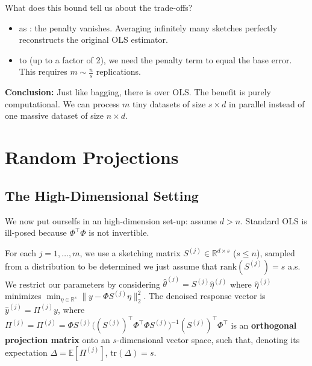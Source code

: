 \documentclass[
11pt,notheorems,hyperref={pdfauthor=whatever}
]{beamer}
\begin{document}
\begin{frame}
    What does this bound tell us about the trade-offs?
    \begin{itemize}
        \item as : the penalty vanishes. Averaging infinitely many sketches perfectly reconstructs the original OLS estimator.
        \item to  (up to a factor of 2), we need the penalty term to equal the base error. This requires \(m \sim \frac{n}{s}\) replications.
    \end{itemize}
    \vspace{0.5cm}
    \textbf{Conclusion:} Just like bagging, there is  over OLS. The benefit is purely computational. We can process \(m\) tiny datasets of size \(s \times d\) in parallel instead of one massive dataset of size \(n \times d\).
\end{frame}

\section{Random Projections}
\subsection{The High-Dimensional Setting}
\begin{frame}
    We now put ourselfs in an high-dimension set-up: assume \(d > n\). Standard OLS is ill-posed because \(\Phi^\top\Phi\) is not invertible.
    
    For each \(j = 1,\dots,m\), we use a sketching matrix \(S^{(j)} \in \mathbb{R}^{d \times s}\) (\(s \le n\)), sampled from a distribution to be determined we just assume that \(\text{rank}(S^{(j)}) = s\) a.s. We restrict our parameters by considering \(\hat{\theta}^{(j)} = S^{(j)}\hat{\eta}^{(j)}\) where \(\hat{\eta}^{(j)}\) minimizes \(\min_{\eta \in \mathbb{R}^s} \|y - \Phi S^{(j)}\eta\|_2^2\).
    The denoised response vector is \(\hat{y}^{(j)} = \Pi^{(j)} y\), where \(\Pi^{(j)} = \Pi^{(j)} = \Phi S^{(j)} \big((S^{(j)})^\top\Phi^\top\Phi S^{(j)}\big)^{-1} (S^{(j)})^\top\Phi^\top\) is an \alert{\textbf{orthogonal projection matrix}} onto an \(s\)-dimensional vector space, such that, denoting its expectation \(\Delta = \mathbb{E}[\Pi^{(j)}]\), \(\text{tr}(\Delta) = s\).
\end{frame}
\end{document}
